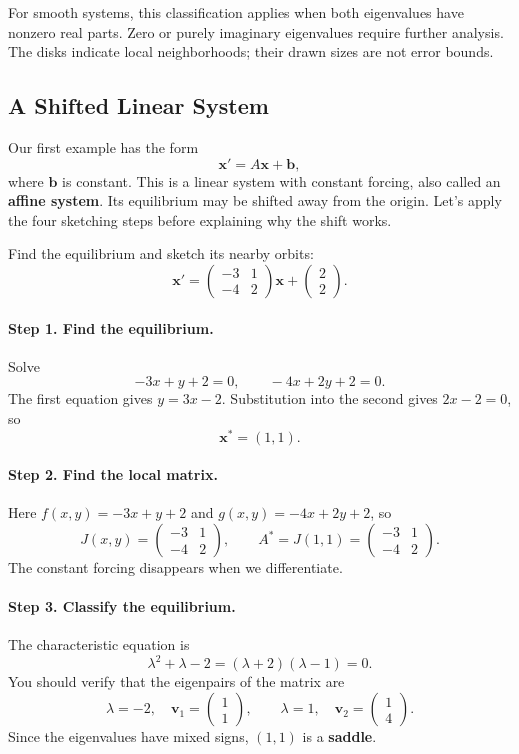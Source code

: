 \documentclass[10pt,letterpaper]{article}
\begin{document}
For smooth systems, this classification applies when both eigenvalues have nonzero real parts. Zero or purely imaginary eigenvalues require further analysis. The disks indicate local neighborhoods; their drawn sizes are not error bounds.

\subsection{A Shifted Linear System}
Our first example has the form
\[
\mathbf{x}'=A\mathbf{x}+\mathbf{b},
\]
where $\mathbf{b}$ is constant. This is a linear system with constant forcing, also called an \textbf{affine system}. Its equilibrium may be shifted away from the origin. Let's apply the four sketching steps before explaining why the shift works.

\begin{example}[4]{

Find the equilibrium and sketch its nearby orbits:
\[
\mathbf{x}'=
\begin{pmatrix}-3&1\\-4&2\end{pmatrix}\mathbf{x}
+\begin{pmatrix}2\\2\end{pmatrix}.
\]
}
\paragraph{Step 1. Find the equilibrium.}
Solve
\[
-3x+y+2=0,\qquad -4x+2y+2=0.
\]
The first equation gives $y=3x-2$. Substitution into the second gives $2x-2=0$, so
\[
\boxed{\mathbf{x}^*=(1,1).}
\]

\paragraph{Step 2. Find the local matrix.}
Here $f(x,y)=-3x+y+2$ and $g(x,y)=-4x+2y+2$, so
\[
J(x,y)=\begin{pmatrix}-3&1\\-4&2\end{pmatrix},
\qquad
A^*=J(1,1)=\begin{pmatrix}-3&1\\-4&2\end{pmatrix}.
\]
The constant forcing disappears when we differentiate.

\paragraph{Step 3. Classify the equilibrium.}
The characteristic equation is
\[
\lambda^2+\lambda-2=(\lambda+2)(\lambda-1)=0.
\]
You should verify that the eigenpairs of the matrix are
\[
\lambda=-2,\quad \mathbf{v}_1=\begin{pmatrix}1\\1\end{pmatrix},
\qquad
\lambda=1,\quad \mathbf{v}_2=\begin{pmatrix}1\\4\end{pmatrix}.
\]
Since the eigenvalues have mixed signs, $(1,1)$ is a \textbf{saddle}.


\end{example}
\end{document}
